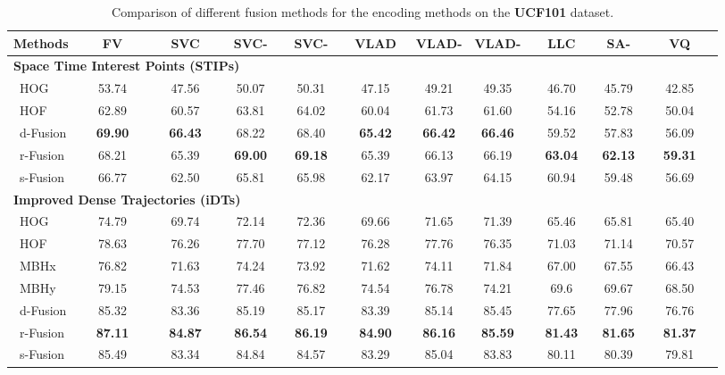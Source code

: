 \documentclass[twocolumn]{svjour3}          \smartqed  \usepackage{slashbox}
\begin{document}
\begin{table*}
  \caption{Comparison of different fusion methods for the encoding methods on the \textbf{UCF101} dataset.}
  \label{tbl:ucf101}
  \centering
  \begin{tabular}{lcccccccccc}
  \hline
  \hline
  Methods & ~~~FV~~~ & ~~SVC~~ & ~SVC-~ & ~SVC-~ & ~VLAD~ & VLAD- & VLAD- & ~~LLC~~ & SA- & ~~~VQ~~~ \\
  \hline
  \hline
  \multicolumn{11}{l}{\textbf{Space Time Interest Points (STIPs)}} \\
  ~HOG & 53.74 & 47.56 &  50.07 &  50.31 & 47.15 & 49.21 & 49.35 & 46.70 & 45.79 & 42.85 \\
  ~HOF & 62.89 & 60.57 &  63.81 &  64.02 & 60.04 & 61.73 & 61.60 & 54.16 & 52.78 & 50.04\\
  ~d-Fusion & \textbf{69.90} & \textbf{66.43} & 68.22 &  68.40 & \textbf{65.42} & \textbf{66.42} & \textbf{66.46} & 59.52 & 57.83 & 56.09 \\
  ~r-Fusion & 68.21 & 65.39 & \textbf{69.00} & \textbf{69.18} & 65.39& 66.13 & 66.19 & \textbf{63.04} & \textbf{62.13} & \textbf{59.31} \\
  ~s-Fusion & 66.77 & 62.50 & 65.81 & 65.98 & 62.17 & 63.97 & 64.15 & 60.94 & 59.48 & 56.69 \\
  \hline
  \multicolumn{11}{l}{\textbf{Improved Dense Trajectories (iDTs)}} \\
  ~HOG & 74.79 & 69.74 & 72.14 & 72.36 & 69.66 & 71.65 & 71.39 & 65.46 & 65.81 & 65.40 \\
  ~HOF & 78.63 & 76.26 & 77.70 & 77.12 & 76.28 & 77.76 & 76.35 & 71.03 & 71.14 & 70.57 \\
  ~MBHx & 76.82 & 71.63 & 74.24 & 73.92 & 71.62 & 74.11 & 71.84 & 67.00 & 67.55 & 66.43 \\
  ~MBHy & 79.15 & 74.53 & 77.46 & 76.82 & 74.54 & 76.78 & 74.21 & 69.6 & 69.67 & 68.50 \\
  ~d-Fusion & 85.32 & 83.36 & 85.19 & 85.17 & 83.39 & 85.14 & 85.45 & 77.65 & 77.96 & 76.76 \\
  ~r-Fusion & \textbf{87.11} & \textbf{84.87} & \textbf{86.54} & \textbf{86.19 }& \textbf{84.90} & \textbf{86.16} & \textbf{85.59} & \textbf{81.43} & \textbf{81.65} & \textbf{81.37} \\
  ~s-Fusion &  85.49 & 83.34 & 84.84 & 84.57 & 83.29 &  85.04 & 83.83 &  80.11 &  80.39 & 79.81 \\
  \hline
  \hline
  \end{tabular}
\end{table*}
\end{document}
